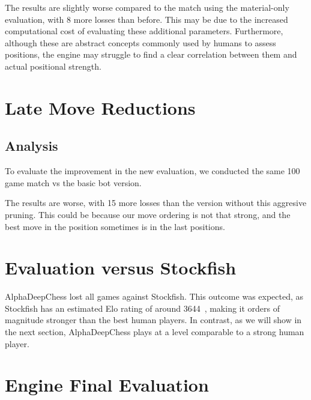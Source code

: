 \noindent The results are slightly worse compared to the match using the material-only evaluation, with 8 more losses than before. This may be due to the increased computational cost of evaluating these additional parameters. Furthermore, although these are abstract concepts commonly used by humans to assess positions, the engine may struggle to find a clear correlation between them and actual positional strength.

\section{Late Move Reductions}

\subsection*{Analysis}

To evaluate the improvement in the new evaluation, we conducted the same 100 game match vs the basic bot version.

\begin{center}
\medskip
\end{center}

\noindent The results are worse, with 15 more losses than the version without this aggresive pruning. This could be because our move ordering is not that strong, and the best move in the position sometimes is in the last positions.

\newpage

\section{Evaluation versus Stockfish}

\begin{center}
\medskip
\end{center}

\noindent AlphaDeepChess lost all games against Stockfish. This outcome was expected, as Stockfish has an estimated Elo rating of around 3644~\cite{StockfishElo}, making it orders of magnitude stronger than the best human players. In contrast, as we will show in the next section, AlphaDeepChess plays at a level comparable to a strong human player.

\section{Engine Final Evaluation}

